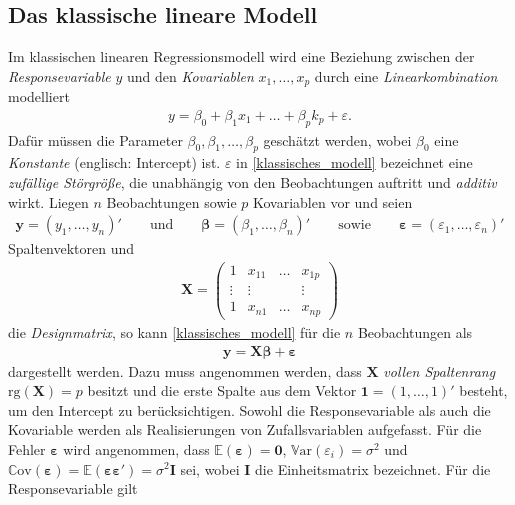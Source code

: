 \documentclass[12pt, a4paper]{report}\usepackage[]{graphicx}\usepackage[]{color}
\begin{document}
\subsection{Das klassische lineare Modell}\label{Kap_Das klassische lineare Modell}
Im klassischen linearen Regressionsmodell wird eine Beziehung zwischen der \textit{Responsevariable} $y$ und den \textit{Kovariablen} $x_1, \dots, x_p$ durch eine \textit{Linearkombination} modelliert
\begin{align}\label{klassisches_modell}
y=\beta_0 + \beta_1 x_1 + \dots + \beta_p k_p + \varepsilon.
\end{align}
Dafür müssen die Parameter $\beta_0, \beta_1, \dots, \beta_p$ geschätzt werden, wobei $\beta_0$ eine \textit{Konstante} (englisch: Intercept) ist. $\varepsilon$ in \eqref{klassisches_modell} bezeichnet eine \textit{zufällige Störgröße}, die unabhängig von den Beobachtungen auftritt und \textit{additiv} wirkt. Liegen $n$ Beobachtungen sowie $p$ Kovariablen vor und seien
\begin{align*}
\mathbf{y} = (y_1,\dots,y_n)'
\qquad \text{und} \qquad
\boldsymbol{\beta} = (\beta_1,\dots,\beta_n
)'
\qquad \text{sowie} \qquad
\boldsymbol{\varepsilon} = (\varepsilon_1,\dots,\varepsilon_n
)'
\end{align*}
Spaltenvektoren und
\begin{align*}
\mathbf{X} = \begin{pmatrix}
1 & x_{11} & \dots & x_{1p}\\ 
\vdots & \vdots & &\vdots\\
1 & x_{n1} & \dots & x_{np}
\end{pmatrix}
\end{align*}
die \textit{Designmatrix}, so kann \eqref{klassisches_modell} für die $n$ Beobachtungen als
\begin{align}\label{klass_lin_matrix}
\mathbf{y}=\mathbf{X}\boldsymbol{\beta}+\boldsymbol{\varepsilon}
\end{align}
dargestellt werden. Dazu muss angenommen werden, dass $\mathbf{X}$ \textit{vollen Spaltenrang} $\text{rg}(\mathbf{X})=p$ besitzt und die erste Spalte aus dem Vektor $\mathbf{1}=(1,\dots, 1)'$ besteht, um den Intercept zu berücksichtigen. Sowohl die Responsevariable als auch die Kovariable werden als Realisierungen von Zufallsvariablen aufgefasst. Für die Fehler $\boldsymbol{\varepsilon}$ wird angenommen, dass  $\mathbb{E}(\boldsymbol{\varepsilon})=\mathbf{0}$, $\mathbb{V}\text{ar}(\varepsilon_i)=\sigma^2$ und $\mathbb{C}\text{ov}(\boldsymbol{\varepsilon})=\mathbb{E}(\boldsymbol{\varepsilon}\boldsymbol{\varepsilon}')=\sigma^2\mathbf{I}$ sei, wobei $\mathbf{I}$ die Einheitsmatrix bezeichnet. Für die Responsevariable gilt
\end{document}
